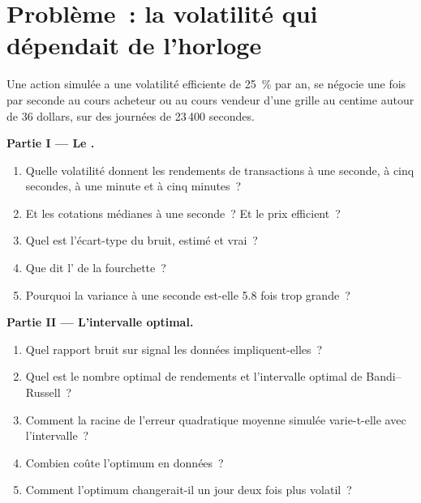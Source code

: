 \section{Problème~: la volatilité qui dépendait de l'horloge}

\begin{problem}\label{pb:qm:high-frequency-econometrics:1}
Une action simulée a une volatilité efficiente de 25~\% par an, se négocie une fois par seconde au cours acheteur ou au cours vendeur d'une grille au centime autour de 36 dollars, sur des journées de 23\,400 secondes.

\medskip\noindent\textbf{Partie I --- Le .}
\begin{enumerate}
\item Quelle volatilité donnent les rendements de transactions à une seconde, à cinq secondes, à une minute et à cinq minutes~?
\item Et les cotations médianes à une seconde~? Et le prix efficient~?
\item Quel est l'écart-type du bruit, estimé et vrai~?
\item Que dit l' de la fourchette~?
\item Pourquoi la variance à une seconde est-elle 5.8 fois trop grande~?
\end{enumerate}

\medskip\noindent\textbf{Partie II --- L'intervalle optimal.}
\begin{enumerate}[resume]
\item Quel rapport bruit sur signal les données impliquent-elles~?
\item Quel est le nombre optimal de rendements et l'intervalle optimal de Bandi--Russell~?
\item Comment la racine de l'erreur quadratique moyenne simulée varie-t-elle avec l'intervalle~?
\item Combien coûte l'optimum en données~?
\item Comment l'optimum changerait-il un jour deux fois plus volatil~?
\end{enumerate}


\end{problem}
